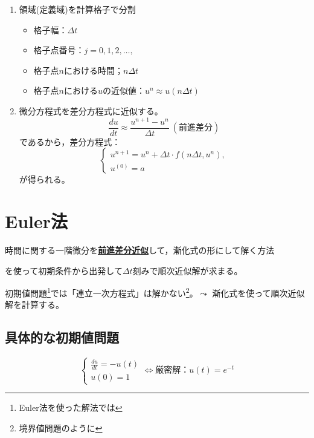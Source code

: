 \documentclass{jsreport}
\begin{document}
\begin{tcolorbox}[title= 初期値問題の差分方程式の立て方]
\begin{enumerate}
	\item 領域(定義域)を計算格子で分割
\begin{itemize}
	\item 格子幅：$\Delta t$
	\item 格子点番号：$j= 0, 1, 2, \ldots, $
	\item 格子点$n$における時間；$n\Delta t$
	\item 格子点$n$における$u$の近似値：$u^ n\approx u(n\Delta t)$
\end{itemize}
	\item 微分方程式を差分方程式に近似する。
\begin{equation}
	\frac{du}{dt}\approx \frac{u^{n+ 1}- u^n}{\Delta t}\ (前進差分)
\end{equation}
	であるから，差分方程式：
\begin{equation} \label{eq:初期値問題における差分方程式}
\begin{cases}
	u^{n+ 1}= u^n+ \Delta t\cdot f(n\Delta t, u^n),\\
	u^{(0)}= a
\end{cases}
\end{equation}
	が得られる。
\end{enumerate}
\end{tcolorbox}

\section{Euler法}
	時間に関する一階微分を\underline{\textbf{前進差分近似}}して，漸化式の形にして解く方法

	を使って初期条件から出発して$\Delta t$刻みで順次近似解が求まる。

\begin{tcolorbox}
	初期値問題\footnote{Euler法を使った解法では}では「連立一次方程式」は解かない\footnote{境界値問題のように}。$\leadsto$ 漸化式を使って順次近似解を計算する。
\end{tcolorbox}

\subsection{具体的な初期値問題}
\begin{equation}
\begin{cases}
	\frac{du}{dt}= -u(t)\\
	u(0)= 1
\end{cases}
	\Longleftrightarrow
	厳密解：u(t)= e^{-t}
\end{equation}
\end{document}
